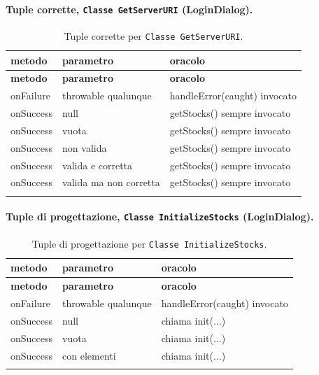 \paragraph*{Tuple corrette, \texttt{Classe GetServerURI} (LoginDialog).}

{\footnotesize\setlength{\tabcolsep}{3pt}
\begin{longtable}{>{\raggedright\arraybackslash}p{}>{\raggedright\arraybackslash}p{}>{\raggedright\arraybackslash}p{}}
\toprule
\textbf{metodo} & \textbf{parametro} & \textbf{oracolo} \\
\midrule
\endfirsthead
\toprule
\textbf{metodo} & \textbf{parametro} & \textbf{oracolo} \\
\midrule
\endhead
\bottomrule
\endfoot
onFailure & throwable qualunque & handleError(caught) invocato \\
onSuccess & null & getStocks() sempre invocato \\
onSuccess & vuota & getStocks() sempre invocato \\
onSuccess & non valida & getStocks() sempre invocato \\
onSuccess & valida e corretta & getStocks() sempre invocato \\
onSuccess & valida ma non corretta & getStocks() sempre invocato \\
\bottomrule
\caption{Tuple corrette per \texttt{Classe GetServerURI}.}
\label{tab:logindialog-getserveruri-tuple-corrette}
\end{longtable}
}



\paragraph*{Tuple di progettazione, \texttt{Classe InitializeStocks} (LoginDialog).}

{\footnotesize\setlength{\tabcolsep}{3pt}
\begin{longtable}{>{\raggedright\arraybackslash}p{}>{\raggedright\arraybackslash}p{}>{\raggedright\arraybackslash}p{}}
\toprule
\textbf{metodo} & \textbf{parametro} & \textbf{oracolo} \\
\midrule
\endfirsthead
\toprule
\textbf{metodo} & \textbf{parametro} & \textbf{oracolo} \\
\midrule
\endhead
\bottomrule
\endfoot
onFailure & throwable qualunque & handleError(caught) invocato \\
onSuccess & null & chiama init(...) \\
onSuccess & vuota & chiama init(...) \\
onSuccess & con elementi & chiama init(...) \\
\bottomrule
\caption{Tuple di progettazione per \texttt{Classe InitializeStocks}.}
\label{tab:logindialog-initializestocks-tuple}
\end{longtable}
}


